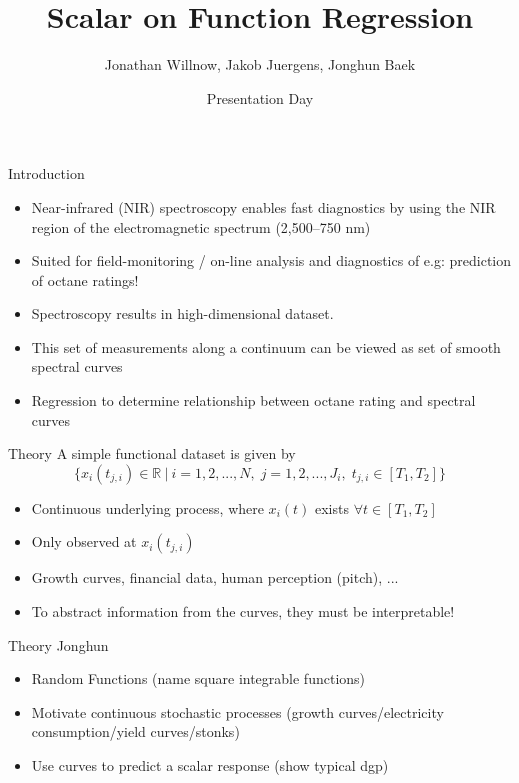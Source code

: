 \documentclass{beamer}
\title{Scalar on Function Regression}
\author{Jonathan Willnow, Jakob Juergens, Jonghun Baek}
\date{{\color{red}}Presentation Day}
\begin{document}
	
	\begin{frame}
		\titlepage 
	\end{frame}
	
	\logo{}
	
	
	\begin{frame}{Introduction}
	
		\begin{itemize}
			\item Near-infrared (NIR) spectroscopy enables fast diagnostics by using the NIR region of the electromagnetic spectrum (2,500–750 nm)
			\item Suited for field-monitoring / on-line analysis and diagnostics of e.g: prediction of octane ratings!
			\item Spectroscopy results in high-dimensional dataset.	
			\item This set of measurements along a continuum can be viewed as set of smooth spectral curves
			\item Regression to determine relationship between octane rating and spectral curves
			\end{itemize}
	\end{frame}
	
	\begin{frame}{Theory}
		A simple functional dataset is given by 
		$$\{x_{i}(t_{j,i}) \in \mathbb{R} \: \vert \: i = 1,2,...,N, \; j = 1,2,..., J_i, \; t_{j,i} \in [T_1, T_2] \}$$
		
		\begin{itemize}
			\item Continuous underlying process, where $x_i(t)$ exists $\forall t \in [T_1, T_2]$
			\item Only observed at $x_{i}(t_{j,i})$
			\item Growth curves, financial data, human perception (pitch), ...
			\item To abstract information from the curves, they must be interpretable!
			\end{itemize}
	\end{frame}

	\begin{frame}{Theory}
		Jonghun
		\begin{itemize}
			\item Random Functions (name square integrable functions)
			\item Motivate continuous stochastic processes (growth curves/electricity consumption/yield curves/stonks)
			\item Use curves to predict a scalar response (show typical dgp)
		\end{itemize}
	\end{frame}
\end{document}
